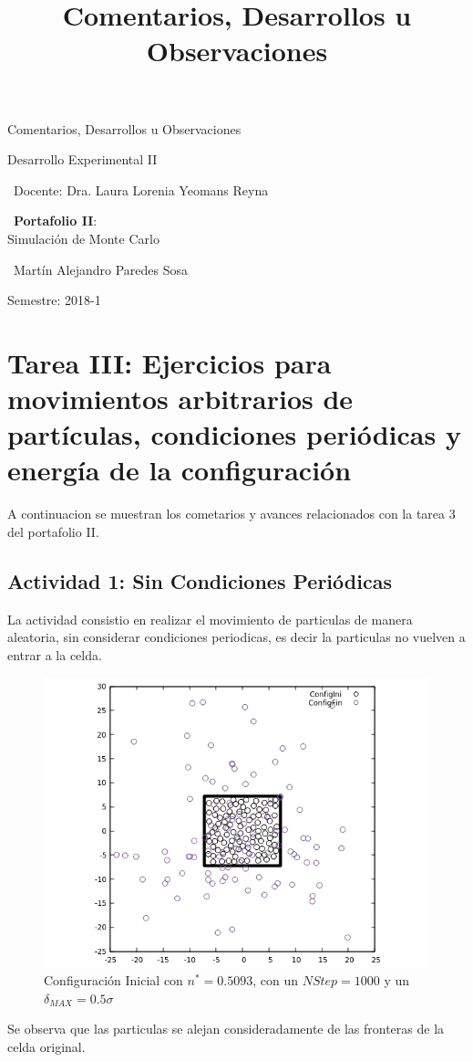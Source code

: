 \documentclass[12pt,letterpaper]{article}
\title{ Comentarios, Desarrollos u Observaciones  }
\begin{document}
\begin{titlepage}
	\centering
    \vspace*{2cm}
	{\Huge Comentarios, Desarrollos u Observaciones \par}
	\vfill
	{\Large Desarrollo Experimental II \par}
	\vfill
	{\large\ Docente: Dra. Laura Lorenia Yeomans Reyna \par}
    \vfill
    {\large\ \textbf{Portafolio II}:\\ Simulación de Monte Carlo \par}
    \vfill
    {\large\ Martín Alejandro Paredes Sosa \par}
	\vfill
	{\large Semestre: 2018-1\par}
\end{titlepage}
\section*{Tarea III: Ejercicios para movimientos arbitrarios de partículas, condiciones periódicas y energía de la configuración }
A continuacion se muestran los cometarios y avances relacionados con la tarea 3 del portafolio II.
\vspace{-0.5cm}

\subsection*{Actividad 1: Sin Condiciones Periódicas}
La actividad consistio en realizar el movimiento de particulas de manera aleatoria, sin considerar condiciones periodicas, es decir la particulas no vuelven a entrar a la celda. 
	\begin{figure}[H]
		\centering
		\includegraphics[scale=0.75]{Config_INI_FIN_2.png}
		\caption{Configuración Inicial con $n^*=0.5093$, con un $NStep=1000$ y un $\delta_{MAX}=0.5\sigma$}
	\end{figure}
	Se observa que las particulas se alejan consideradamente de las fronteras de la celda original.
\end{document}
